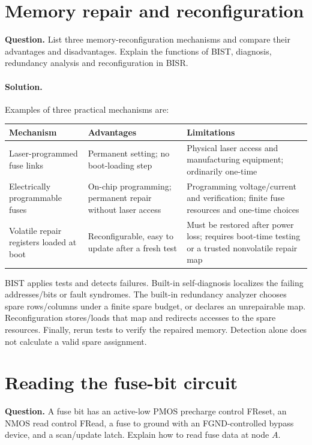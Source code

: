 \documentclass[11pt]{article}
\newcommand{\sol}{\paragraph{Solution.}}
\begin{document}
\section{Memory repair and reconfiguration}
\textbf{Question.} List three memory-reconfiguration mechanisms and compare
their advantages and disadvantages. Explain the functions of BIST,
diagnosis, redundancy analysis and reconfiguration in BISR.
\sol Examples of three practical mechanisms are:
\begin{center}\begin{tabular}{>{\raggedright\arraybackslash}p{28mm}>{\raggedright\arraybackslash}p{55mm}>{\raggedright\arraybackslash}p{55mm}}\toprule
Mechanism & Advantages & Limitations\\\midrule
Laser-programmed fuse links & Permanent setting; no boot-loading step &
Physical laser access and manufacturing equipment; ordinarily one-time\\
Electrically programmable fuses & On-chip programming; permanent repair
without laser access & Programming voltage/current and verification;
finite fuse resources and one-time choices\\
Volatile repair registers loaded at boot & Reconfigurable, easy to update
after a fresh test & Must be restored after power loss; requires boot-time
testing or a trusted nonvolatile repair map\\\bottomrule
\end{tabular}\end{center}
BIST applies tests and detects failures. Built-in self-diagnosis localizes
the failing addresses/bits or fault syndromes. The built-in redundancy analyzer
chooses spare rows/columns under a finite spare budget, or declares an
unrepairable map. Reconfiguration stores/loads that map and redirects accesses
to the spare resources. Finally, rerun tests to verify the repaired memory.
Detection alone does not calculate a valid spare assignment.

\section{Reading the fuse-bit circuit}
\textbf{Question.} A fuse bit has an active-low PMOS precharge control
FReset, an NMOS read control FRead, a fuse to ground with an FGND-controlled
bypass device, and a scan/update latch. Explain how to read fuse data at node $A$.
\begin{center}\end{center}
\end{document}
